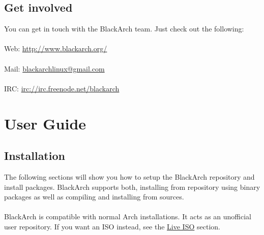 \documentclass[a4paper, oneside, 11pt]{book}
\begin{document}


\section{Get involved}
You can get in touch with the BlackArch team. Just check out the following:
\\\\
Web: \url{http://www.blackarch.org/}
\\\\
Mail: \href{mailto:blackarchlinux@gmail.com}{blackarchlinux@gmail.com}
\\\\
IRC: \url{irc://irc.freenode.net/blackarch}


\chapter{User Guide}

\section{Installation}
The following sections will show you how to setup the BlackArch repository and
install packages. BlackArch supports both, installing from repository using
binary packages as well as compiling and installing from sources.
\\\\
BlackArch is compatible with normal Arch installations. It acts as an unofficial
user repository. If you want an ISO instead, see the
\href{http://www.blackarch.org/download.html#iso}{Live ISO} section.
\\\\
\end{document}
